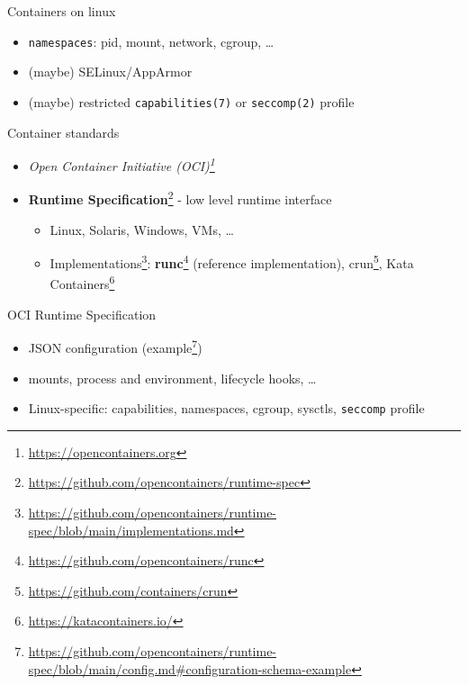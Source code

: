 \documentclass[ignorenonframetext,aspectratio=169,12pt]{beamer}
\begin{document}
\begin{frame}{Containers on linux}
\protect\hypertarget{container-linux}{}

\begin{itemize}
    \item {\tt namespaces}: pid, mount, network, cgroup, \ldots{}
    \item (maybe) SELinux/AppArmor
    \item (maybe) restricted \texttt{capabilities(7)} or
        \texttt{seccomp(2)} profile
\end{itemize}

\end{frame}

\begin{frame}{Container standards}
\protect\hypertarget{container-standards}{}
\begin{itemize}
    \item {\em Open Container Initiative (OCI)\footnote{\url{https://opencontainers.org}}}
    \item {\bf Runtime Specification}\footnote{\url{https://github.com/opencontainers/runtime-spec}} - low level runtime interface
    \begin{itemize}
        \item Linux, Solaris, Windows, VMs, \ldots{}
        \item Implementations\footnote{\url{https://github.com/opencontainers/runtime-spec/blob/main/implementations.md}}:
          {\bf runc}\footnote{\url{https://github.com/opencontainers/runc}} (reference implementation),
          crun\footnote{\url{https://github.com/containers/crun}},
          Kata Containers\footnote{\url{https://katacontainers.io/}}
    \end{itemize}
\end{itemize}
\end{frame}

\begin{frame}{OCI Runtime Specification}
\protect\hypertarget{oci-runtime-spec}{}
\begin{itemize}

\item JSON configuration (example\footnote{\url{https://github.com/opencontainers/runtime-spec/blob/main/config.md\#configuration-schema-example}})

\item mounts, process and environment, lifecycle hooks, \ldots{}

\item Linux-specific: capabilities, namespaces, cgroup, sysctls,
      {\tt seccomp} profile

\end{itemize}

\end{frame}
\end{document}
